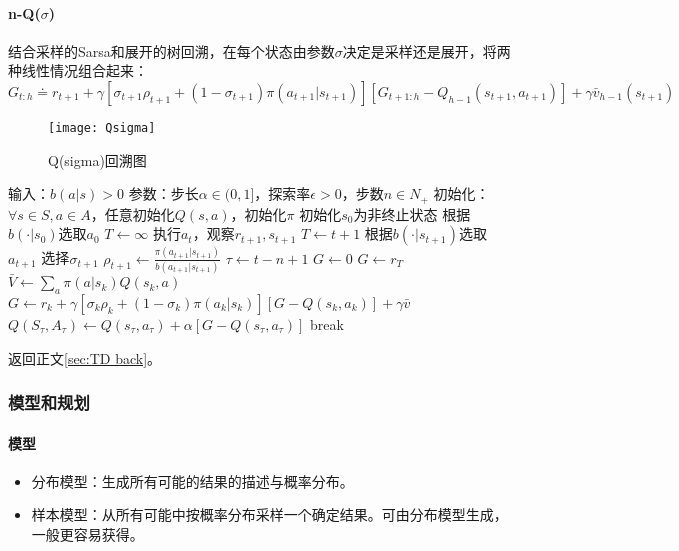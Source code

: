 \documentclass[
12pt, %
a4paper, 
oneside, %
headinclude,footinclude, %
]{scrartcl}
\begin{document}
\paragraph{n-Q($ \sigma $)}
结合采样的Sarsa和展开的树回溯，在每个状态由参数$ \sigma $决定是采样还是展开，将两种线性情况组合起来：
$$ G_{t:h} \doteq r_{t + 1} + \gamma [\sigma_{t + 1}\rho_{t + 1} + (1 - \sigma_{t + 1})\pi(a_{t + 1}|s_{t + 1})][G_{t + 1:h} - Q_{h - 1}(s_{t + 1}, a_{t + 1})] + \gamma \bar{v}_{h - 1}(s_{t + 1}) $$

\begin{figure}[H]
\centering
\texttt{[image: Qsigma]}
\caption{Q(sigma)回溯图}
\end{figure}
\begin{myalgorithm}
\State 输入：$ b(a|s) > 0 $
\State 参数：步长$ \alpha \in (0,1] $，探索率$ \epsilon > 0 $，步数$ n \in N_+ $
\State 初始化：$ \forall s \in S, a \in A $，任意初始化$ Q(s, a) $，初始化$ \pi $
\State 初始化$ s_0 $为非终止状态
\State 根据$ b(\cdot|s_0) $选取$ a_0 $
\State $ T \gets \infty $
\State 执行$ a_t $，观察$ r_{t + 1}, s_{t + 1} $
\State $ T \gets t + 1 $
\Else
\State 根据$ b(\cdot|s_{t + 1}) $选取$ a_{t + 1} $
\State 选择$ \sigma_{t + 1} $ 
\State $ \rho_{t + 1} \gets \frac{\pi(a_{t + 1}|s_{t + 1})}{b(a_{t + 1}|s_{t + 1})}$ 
\EndIf
\EndIf
\State $ \tau \gets t - n + 1 $ 
\State $ G \gets 0 $
\State $ G \gets r_T $
\Else
\State $ \bar{V} \gets \sum_a \pi(a|s_k)Q(s_k, a) $ 
\State $ G \gets r_k + \gamma[\sigma_k \rho_k + (1 - \sigma_k)\pi(a_k|s_k)][G - Q(s_k, a_k)] + \gamma\bar{v} $
\EndIf
\EndFor
\State $ Q(S_{\tau},A_{\tau}) \gets Q(s_{\tau}, a_{\tau}) + \alpha[G - Q(s_{\tau}, a_{\tau})] $
\EndIf
{}
\State break
\EndIf
\EndFor
\EndFor
\end{myalgorithm}

返回正文\ref{sec:TD back}。
\subsubsection[模型和规划]{模型和规划}\label{sec:table}
\paragraph{模型}
\begin{itemize}
\item 分布模型：生成所有可能的结果的描述与概率分布。
\item 样本模型：从所有可能中按概率分布采样一个确定结果。可由分布模型生成，一般更容易获得。
\end{itemize}
\end{document}
